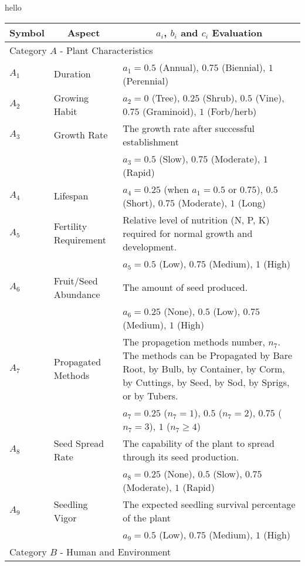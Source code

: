 \documentclass[12pt]{article}
\begin{document}
	hello
	
	{
	\fontsize{10}{13}\selectfont
	{
	\begin{longtable}{p{0.2in}p{1.5in}p{4.3in}}
	
	\toprule
	\multicolumn{1}{c}{\textbf{Symbol}} 
		& \multicolumn{1}{c}{\textbf{Aspect}}
		& \multicolumn{1}{c}{\textbf{$a_i$, $b_i$ and $c_i$ Evaluation}} \\

	\toprule
	\multicolumn{3}{l}{Category $A$ - Plant Characteristics}\\
	\midrule
	
	$A_1$ & Duration & $a_1=0.5$ (Annual), $0.75$ (Biennial), $1$ (Perennial)\\
	$A_2$ & Growing Habit & $a_2=0$ (Tree), $0.25$ (Shrub), $0.5$ (Vine), $0.75$ (Graminoid), $1$ (Forb/herb)\\ 
	$A_3$ & Growth Rate & The growth rate after successful establishment\\
		&& $a_3=0.5$ (Slow), $0.75$ (Moderate), $1$ (Rapid)\\
	$A_4$ & Lifespan & $a_4=0.25$ (when $a_1=0.5$ or $0.75$), $0.5$ (Short), $0.75$ (Moderate), $1$ (Long) \\
	$A_5$ & Fertility Requirement & Relative level of nutrition (N, P, K) required for normal growth and development.\\
		 && $a_5=0.5$ (Low), $0.75$ (Medium), $1$ (High)\\
	$A_6$ & Fruit/Seed Abundance & The amount of seed produced.\\
		&& $a_6=0.25$ (None), $0.5$ (Low), $0.75$ (Medium), $1$ (High)\\
	$A_7$ & Propagated Methods & The propagetion methods number, $n_7$. The methods can be Propagated by Bare Root, by Bulb, by Container, by Corm, by Cuttings, by Seed, by Sod, by Sprigs, or by Tubers. \\
		&& $a_7=0.25$ ($n_7=1$), $0.5$ ($n_7=2$), $0.75$ ($n_7=3$), $1$ ($n_7\geq4$)\\
	$A_8$ & Seed Spread Rate & The capability of the plant to spread through its seed production.\\
		&& $a_8=0.25$ (None), $0.5$ (Slow), $0.75$ (Moderate), $1$ (Rapid)\\
	$A_9$ & Seedling Vigor & The expected seedling survival percentage of the plant\\
		&& $a_9=0.5$ (Low), $0.75$ (Medium), $1$ (High)\\
	
	\midrule
	\multicolumn{3}{l}{Category $B$ - Human and Environment}  \\
	\midrule
	

\end{longtable}}}
\end{document}
